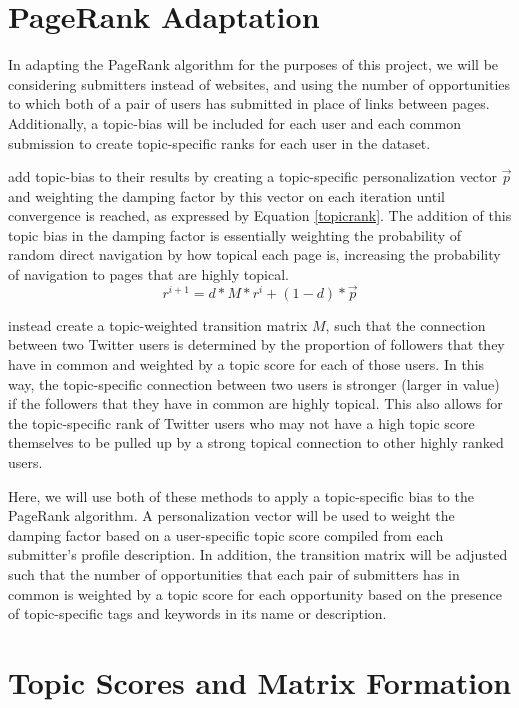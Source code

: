 \documentclass[12pt]{report}   %
\begin{document}
\section{PageRank Adaptation}

In adapting the PageRank algorithm for the purposes of this project, we will be considering submitters instead of websites, and using the number of opportunities to which both of a pair of users has submitted in place of links between pages. Additionally, a topic-bias will be included for each user and each common submission to create topic-specific ranks for each user in the dataset.

 add topic-bias to their results by creating a topic-specific personalization vector $\vec{p}$ and weighting the damping factor by this vector on each iteration until convergence is reached, as expressed by Equation \ref{topicrank}. The addition of this topic bias in the damping factor is essentially weighting the probability of random direct navigation by how topical each page is, increasing the probability of navigation to pages that are highly topical. 
\begin{equation}
\label{topicrank}
 r^{i+1}=d*M*r^{i}+(1-d)*\vec{p}
\end{equation}

 instead create a topic-weighted transition matrix $M$, such that the connection between two Twitter users is determined by the proportion of followers that they have in common and weighted by a topic score for each of those users. In this way, the topic-specific connection between two users is stronger (larger in value) if the followers that they have in common are highly topical. This also allows for the topic-specific rank of Twitter users who may not have a high topic score themselves to be pulled up by a strong topical connection to other highly ranked users.

Here, we will use both of these methods to apply a topic-specific bias to the PageRank algorithm. A personalization vector will be used to weight the damping factor based on a user-specific topic score compiled from each submitter's profile description. In addition, the transition matrix will be adjusted such that the number of opportunities that each pair of submitters has in common is weighted by a topic score for each opportunity based on the presence of topic-specific tags and keywords in its name or description.

\section{Topic Scores and Matrix Formation}\label{scoring}
\end{document}
